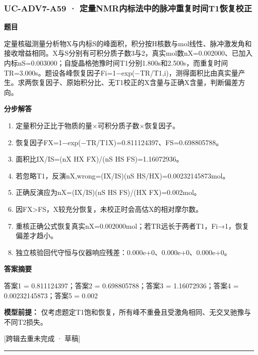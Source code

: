 \documentclass[UTF8,11pt,a4paper]{ctexart}
\begin{document}
\subsubsection*{UC-ADV7-A59 · 定量NMR内标法中的脉冲重复时间T1恢复校正}
\noindent\textbf{题目}\par
定量核磁测量分析物X与内标S的峰面积，积分按H核数与mol线性、脉冲激发角和接收增益相同。X与S分别有可积分质子数3与2，真实mol数nX=0.002000、已加入内标nS=0.003000；自旋晶格弛豫时间T1分别1.800s和2.500s，而重复时间TR=3.000s。题设各峰恢复因子Fi=1−exp(−TR/T1,i)，测得面积比由真实量产生。求两恢复因子、原始积分比、无T1校正的X含量与正确X含量，判断偏差方向。\par
\medskip\noindent\textbf{分步解答}
\begin{enumerate}
\item 定量积分正比于物质的量×可积分质子数×恢复因子。
\item 恢复因子FX=1−exp(−TR/T1X)=0.811124397、FS=0.698805788。
\item 面积比IX/IS=(nX HX FX)/(nS HS FS)=1.16072936。
\item 若忽略T1，反演nX,wrong=(IX/IS)(nS HS/HX)=0.00232145873mol。
\item 正确反演应为nX=(IX/IS)(nS HS FS)/(HX FX)=0.002mol。
\item 因FX>FS，X较充分恢复，未校正时会高估X的相对摩尔数。
\item 重核正确公式恢复真实nX=0.002000mol；若TR远长于两者T1，Fi→1，恢复偏差才趋小。
\item 独立核验回代守恒与仪器响应残差：0.000e+0、0.000e+0、0.000e+0。
\end{enumerate}
\noindent\textbf{答案摘要}\par
答案1 = 0.811124397；答案2 = 0.698805788；答案3 = 1.16072936；答案4 = 0.00232145873；答案5 = 0.002\par
\noindent\textbf{模型前提：}
仅考虑题定T1饱和恢复，所有峰不重叠且受激角相同、无交叉驰豫与不同T2损失。\par
\noindent\textcolor{red!65!black}{[跨辑去重未完成 · 草稿]} \par
\medskip\hrule\medskip
{}
\end{document}
